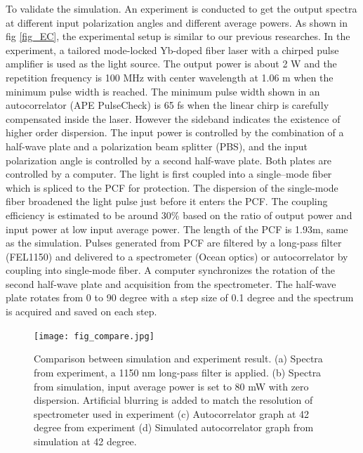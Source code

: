 \documentclass{osa-article}
\begin{document}
To validate the simulation. An experiment is conducted to get the output spectra at different input polarization angles and different average powers. As shown in fig \ref{fig_EC}, the experimental setup is similar to our previous researches\cite{chen_dual-soliton_2016}. In the experiment, a tailored mode-locked Yb-doped fiber laser with a chirped pulse amplifier is used as the light source. The output power is about 2 W and the repetition frequency is 100 MHz with center wavelength at 1.06 \textmu m when the minimum pulse width is reached. The minimum pulse width shown in an autocorrelator (APE PulseCheck) is 65 fs when the linear chirp is carefully compensated inside the laser. However the sideband indicates the existence of higher order dispersion. The input power is controlled by the combination of a half-wave plate and a polarization beam splitter (PBS), and the input polarization angle is controlled by a second half-wave plate. Both plates are controlled by a computer. The light is first coupled into a single–mode fiber which is spliced to the PCF for protection. The dispersion of the single-mode fiber broadened the light pulse just before it enters the PCF. The coupling efficiency is estimated to be around 30\% based on the ratio of output power and input power at low input average power. The length of the PCF is 1.93m, same as the simulation. Pulses generated from PCF are filtered by a long-pass filter (FEL1150) and delivered to a spectrometer (Ocean optics) or autocorrelator by coupling into single-mode fiber. A computer synchronizes the rotation of the second half-wave plate and acquisition from the spectrometer. The half-wave plate rotates from 0 to 90 degree with a step size of 0.1 degree and the spectrum is acquired and saved on each step.

\begin{figure}[htbp]
\centering%
\texttt{[image: fig\_compare.jpg]}
\caption{Comparison between simulation and experiment result. (a) Spectra from experiment, a 1150 nm long-pass filter is applied. (b) Spectra from simulation, input average power is set to 80 mW with zero dispersion. Artificial blurring is added to match the resolution of spectrometer used in experiment (c) Autocorrelator graph at 42 degree from experiment (d) Simulated autocorrelator graph from simulation at 42 degree.}
\label{fig_cmp}\vspace*{-6pt}
\end{figure}
\end{document}
